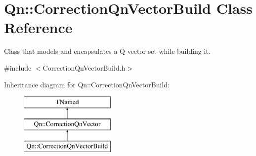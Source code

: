 \hypertarget{classQn_1_1CorrectionQnVectorBuild}{}\section{Qn\+:\+:Correction\+Qn\+Vector\+Build Class Reference}
\label{classQn_1_1CorrectionQnVectorBuild}


Class that models and encapsulates a Q vector set while building it.  




{\ttfamily \#include $<$Correction\+Qn\+Vector\+Build.\+h$>$}

Inheritance diagram for Qn\+:\+:Correction\+Qn\+Vector\+Build\+:\begin{figure}[H]
\begin{center}
\leavevmode
\includegraphics[height=3.000000cm]{classQn_1_1CorrectionQnVectorBuild}
\end{center}
\end{figure}
